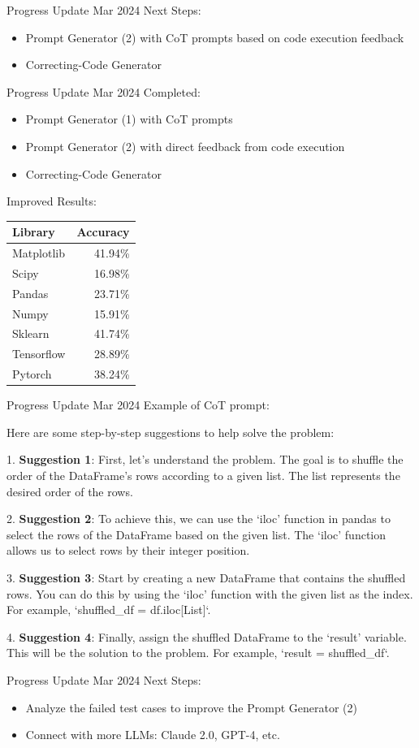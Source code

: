 \begin{frame}{Progress Update  Mar 2024}
    Next Steps:
    \begin{itemize}
        \item Prompt Generator (2) with CoT prompts based on code execution feedback
        \item Correcting-Code Generator
    \end{itemize}
\end{frame}

\begin{frame}{Progress Update  Mar 2024}
    Completed:
    \begin{itemize}
        \item Prompt Generator (1) with CoT prompts
        \item Prompt Generator (2) with direct feedback from code execution
        \item Correcting-Code Generator
    \end{itemize}

    Improved Results:
    \begin{tabular}{lr}
        Library    & Accuracy \\
        \hline
        Matplotlib & 41.94\%  \\
        Scipy      & 16.98\%  \\
        Pandas     & 23.71\%  \\
        Numpy      & 15.91\%  \\
        Sklearn    & 41.74\%  \\
        Tensorflow & 28.89\%  \\
        Pytorch    & 38.24\%  \\
    \end{tabular}
\end{frame}

\begin{frame}{Progress Update  Mar 2024}
    Example of CoT prompt:

    Here are some step-by-step suggestions to help solve the problem:

    1. \textbf{Suggestion 1}: First, let's understand the problem. The goal is to shuffle the order of the DataFrame's rows according to a given list. The list represents the desired order of the rows.

    2. \textbf{Suggestion 2}: To achieve this, we can use the `iloc' function in pandas to select the rows of the DataFrame based on the given list. The `iloc' function allows us to select rows by their integer position.

    3. \textbf{Suggestion 3}: Start by creating a new DataFrame that contains the shuffled rows. You can do this by using the `iloc' function with the given list as the index. For example, `shuffled\_df = df.iloc[List]`.

    4. \textbf{Suggestion 4}: Finally, assign the shuffled DataFrame to the `result' variable. This will be the solution to the problem. For example, `result = shuffled\_df`.
\end{frame}

\begin{frame}{Progress Update  Mar 2024}
    Next Steps:
    \begin{itemize}
        \item Analyze the failed test cases to improve the Prompt Generator (2)
        \item Connect with more LLMs: Claude 2.0, GPT-4, etc.
    \end{itemize}
\end{frame}
